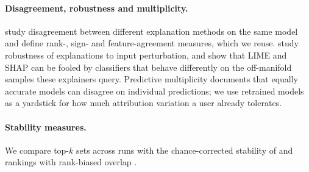 \paragraph{Disagreement, robustness and multiplicity.}
\citet{krishna2022disagreement} study disagreement between different explanation methods on the same model and define rank-, sign- and feature-agreement measures, which we reuse. \citet{alvarezmelis2018robustness} study robustness of explanations to input perturbation, and \citet{slack2019fooling} show that LIME and SHAP can be fooled by classifiers that behave differently on the off-manifold samples these explainers query. Predictive multiplicity \citep{marx2020predictive} documents that equally accurate models can disagree on individual predictions; we use retrained models as a yardstick for how much attribution variation a user already tolerates.

\paragraph{Stability measures.}
We compare top-$k$ sets across runs with the chance-corrected stability of \citet{nogueira2018stability} and rankings with rank-biased overlap \citep{webber2010rbo}.
